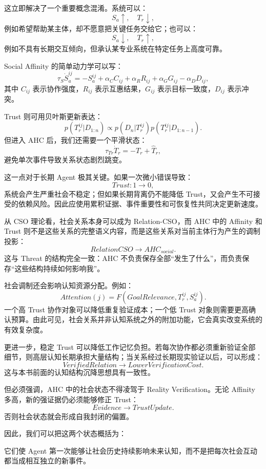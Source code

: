 这立即解决了一个重要概念混淆。系统可以：
\[
S_a\uparrow,\quad T_r\downarrow,
\]
例如希望帮助某主体，却不愿意把关键任务交给它；也可以：
\[
S_a\downarrow,\quad T_r\uparrow,
\]
例如不具有长期交互倾向，但承认某专业系统在特定任务上高度可靠。

Social Affinity 的简单动力学可以写：
\[
\tau_S
\dot S_a^{ij}
=
-S_a^{ij}
+
\alpha_C C_{ij}
+
\alpha_R R_{ij}
+
\alpha_G G_{ij}
-
\alpha_D D_{ij},
\]
其中 \(C_{ij}\) 表示协作强度，\(R_{ij}\) 表示互惠结果，\(G_{ij}\) 表示目标一致度，\(D_{ij}\) 表示冲突。

Trust 则可用贝叶斯更新表达：
\[
p(T_r^{ij}|D_{1:n})
\propto
p(D_n|T_r^{ij})
p(T_r^{ij}|D_{1:n-1}).
\]
但进入 AHC 后，我们还需要一个平滑状态：
\[
\tau_{Tr}\dot T_r
=
-T_r+\hat T_r,
\]
避免单次事件导致关系状态剧烈跳变。

这一点对于长期 Agent 极其关键。如果一次微小错误导致：
\[
Trust:1\rightarrow0,
\]
系统会产生严重社会不稳定；但如果长期背离仍不能降低 Trust，又会产生不可接受的依赖风险。因此应使用累积证据、事件重要性和可恢复性共同决定更新速度。

从 CSO 理论看，社会关系本身可以成为 Relation-CSO，而 AHC 中的 Affinity 和 Trust 则不是这些关系的完整语义内容，而是这些关系对当前主体行为产生的调制投影：
\[
RelationCSO
\rightarrow
AHC_{social}.
\]
这与 Threat 的结构完全一致：AHC 不负责保存全部“发生了什么”，而负责保存“这些结构持续如何影响我”。

社会调制还会影响认知资源分配。例如：
\[
Attention(j)
=
F(
GoalRelevance,
T_r^{ij},
S_a^{ij}
).
\]
一个高 Trust 协作对象可以降低重复验证成本；一个低 Trust 对象则需要更高确认预算。由此可见，社会关系并非认知系统之外的附加功能，它会真实改变系统的有效复杂度。

更进一步，稳定 Trust 可以降低工作记忆负担。若每次协作都必须重新验证全部细节，则高层认知长期承担大量结构；当关系经过长期现实验证以后，可以形成：
\[
VerifiedRelation
\rightarrow
LowerVerificationCost.
\]
这与本书前面的认知结构沉降思想具有一致性。

但必须强调，AHC 中的社会状态不得凌驾于 Reality Verification。无论 Affinity 多高，新的强证据仍必须能够修正 Trust：
\[
Evidence
\rightarrow
TrustUpdate.
\]
否则社会状态就会形成自我封闭的偏置。

因此，我们可以把这两个状态概括为：
\begin{statementbox}
\centering
{}
\end{statementbox}
\begin{statementbox}
\centering
{}
\end{statementbox}
它们使 Agent 第一次能够让社会历史持续影响未来认知，而不是把每次社会互动都当成相互独立的新事件。

